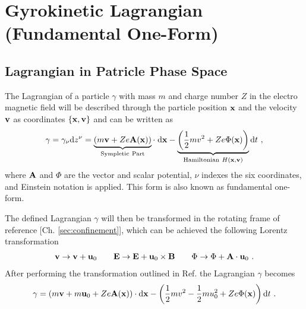 \newpage
\section{Gyrokinetic Lagrangian (Fundamental One-Form)}
\label{sec:lagrangian}

\subsection{Lagrangian in Patricle Phase Space}
\label{sub:particleLagrangian}

The Lagrangian of a particle $\gamma$ with mass $m$ and charge number $Z$ in the electro magnetic field will be described through the particle position $\boldsymbol{\mathbf{x}}$ and the velocity $\boldsymbol{\mathbf{v}}$ as coordinates $\{\boldsymbol{\mathbf{x}}, \boldsymbol{\mathbf{v}} \}$ and can be written as
\begin{gather}
    \gamma = \gamma_\nu \mathrm{d}z^\nu = \underbrace{\left(m\boldsymbol{\mathbf{v}} + Ze\boldsymbol{\mathbf{A}}(\boldsymbol{\mathbf{x}}) \right)}_{\mathrm{Sympletic~Part}}\cdot\;\mathrm{d}\boldsymbol{\mathbf{x}} - \underbrace{\left(\frac{1}{2}mv^2 + Ze\Phi(\boldsymbol{\mathbf{x}})\right)}_{\mathrm{Hamiltonian}~H(\boldsymbol{\mathbf{x}},\boldsymbol{\mathbf{v}})} \mathrm{d}t ~,
    \label{eq:particleLagrangian}
\end{gather}
where $\boldsymbol{\mathbf{A}}$ and $\Phi$ are the vector and scalar potential, $\nu$ indexes the six coordinates, and Einstein notation is applied. This form is also known as fundamental one-form. \bigskip

The defined Lagrangian $\gamma$ will then be transformed in the rotating frame of reference [Ch. \ref{sec:confinement}], which can be achieved the following Lorentz transformation
\begin{gather}
    \boldsymbol{\mathbf{v}} \rightarrow \boldsymbol{\mathbf{v}} + \boldsymbol{\mathbf{u}}_0 \qquad \boldsymbol{\mathbf{E}} \rightarrow \boldsymbol{\mathbf{E}} + \boldsymbol{\mathbf{u}}_0 \times \boldsymbol{\mathbf{B}} \qquad \Phi \rightarrow \Phi + \boldsymbol{\mathbf{A}} \cdot \boldsymbol{\mathbf{u}}_0 ~.
\end{gather}
After performing the transformation outlined in Ref.  the Lagrangian $\gamma$ becomes
\begin{gather}
    \gamma = \left(m\boldsymbol{\mathbf{v}} + m\boldsymbol{\mathbf{u}}_0 + Ze\boldsymbol{\mathbf{A}}(\boldsymbol{\mathbf{x}}) \right) \cdot \mathrm{d}\boldsymbol{\mathbf{x}} - \left(\frac{1}{2}mv^2 - \frac{1}{2}mu_0^2 + Ze\Phi(\boldsymbol{\mathbf{x}})\right) \mathrm{d}t ~.
    \label{eq:particleLagrangianRot}
\end{gather} 

